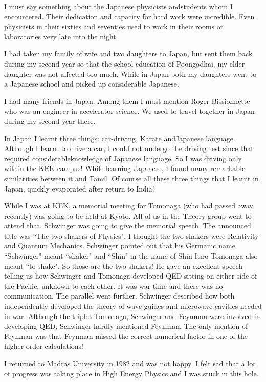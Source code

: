 I must say something about the Japanese physicists and\break students whom I 
encountered. Their dedication and capacity for hard work were 
incredible. Even physicists in their sixties and seventies used to work 
in their rooms or laboratories very late into the night.


I had taken my family of wife and two daughters to Japan, but sent them 
back during my second year so that the school education of Poongodhai, my 
elder daughter was not affected too much. While in Japan both my 
daughters went to a Japanese school and picked up considerable Japanese.


I had many friends in Japan. Among them I must mention Roger 
Bissionnette who was an engineer in accelerator science. We used to 
travel together in Japan during my second year there.


In Japan I learnt three things: car-driving, Karate and\break Japanese 
language. Although I learnt to drive a car, I could not undergo the 
driving test since that required considerable\break knowledge of Japanese 
language. So I was driving only within the KEK campus! While learning 
Japanese, I found many remarkable similarities between it and Tamil. Of 
course all these three things that I learnt in Japan, quickly evaporated 
after return to India!


While I was at KEK, a memorial meeting for Tomonaga (who had passed away 
recently) was going to be held at Kyoto. All of us in the Theory group 
went to attend that. Schwinger was going to give the memorial speech. 
The announced title was ``The two shakers of Physics". I thought the two 
shakers were Relati\-vity and Quantum Mechanics. Schwinger pointed out 
that his Germani\-c name ``Schwinger" meant ``shaker" and ``Shin" in the name 
of Shin Itiro Tomonaga also meant ``to shake". So those are the two 
shakers! He gave an excellent speech telling us how Schwinger and 
Tomonaga developed QED sitting on either side of the Pacific, unknown to 
each other. It was war time and there was no communication. The parallel 
went further. Schwinger described how both independently developed the 
theory of wave guides and microwave cavities needed in war. Although the 
triplet Tomonaga, Schwinger and Feynman were involved in developing QED, 
Schwinger hardly mentioned Feynman. The only mention of Feynman was that 
Feynman missed the correct numerical factor in one of the higher order 
calculations!
 
I returned to Madras University in 1982 and was not happy. I felt sad 
that a lot of progress was taking place in High Energy Physics and I was 
stuck in this hole.

